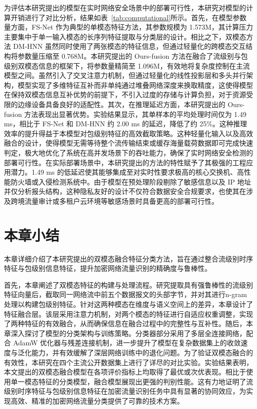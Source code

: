 为评估本研究提出的模型在实时网络安全场景中的部署可行性，本研究对模型的计算开销进行了对比分析，结果如表~\ref{tab:computational}所示。首先，在模型参数量方面，FS-Net 作为典型的单模态特征方法，其参数规模为 1.573M，其计算压力主要集中于单一输入模态的长序列特征提取与分类层的设计。相比之下，双模态方法 DM-HNN 虽然同时使用了两张模态的特征信息，但通过轻量化的跨模态交互结构将参数量压缩至 0.768M。本研究提出的 Ours-fusion 方法在融合了流级别与包级别双模态信息的框架下，将参数量精简至 1.096M，有效地将复杂度控制在主流模型之间。虽然引入了交叉注意力机制，但通过轻量化的线性投影层和多头并行架构，模型实现了多维特征互补而非单纯通过堆叠网络深度来换取精度，这使得模型在保持双模态信息互补优势的前提下，不引入过度的存储与计算负担，对于资源受限的边缘设备具备良好的适配性。其次，在推理延迟方面，本研究提出的 Ours-fusion 方法表现出显著优势。实验结果显示，其单样本的平均处理时间仅为 1.49 ms，相比于 FS-Net 和 DM-HNN 约 2.00 ms 的延迟，降低了约 25\%。这种推理效率的提升得益于本模型对包级别特征的高效截取策略。这种轻量化输入以及高效融合的设计，使得模型无需等待整个流传输结束或缓存海量载荷数据即可完成快速判定，极大地优化了系统在高并发场景下的吞吐能力，确保了实时网络安全检测的部署可行性。在实际部署场景中，本研究提出的方法的特性赋予了其极强的工程应用潜力。1.49 ms 的低延迟使其能够集成至对实时性要求极高的核心交换机、高性能防火墙或入侵检测系统中。由于模型在预处理阶段剔除了敏感信息以及 IP 地址并仅分析报头结构，这种隐私友好的设计不仅符合数据安全合规要求，也使其在涉及跨境流量审计或多租户云环境等敏感场景时具备更高的部署可行性。

\section{本章小结}
本章详细介绍了本研究提出的双模态融合特征分类方法，旨在通过整合流级别时序特征与包级别信息特征，提升加密网络流量识别的精确度与鲁棒性。

首先，本章阐述了双模态特征的构建与处理流程。研究提取具有强鲁棒性的流级别特征向量后，截取同一网络流中前五个数据报文的头部字节，并对其进行n-gram处理以构建包级别特征。针对这两种模态在维度与语义空间上的差异，本章设计了特征融合层。该层采用注意力机制，对两个模态的特征进行自适应权重调整，实现了两种特征的有效融合，从而确保信息在融合过程中的完整性与互补性。随后，本章深入探讨了模型的分类架构与训练策略。分类器部分采用了多层全连接网络，配合 AdamW 优化器与残差连接机制，进一步提升了模型在复杂数据集上的收敛速度与泛化能力，并有效缓解了深层网络训练中的退化问题。为了验证双模态融合的有效性，本研究在四个主流公开数据集上进行了详尽的对比实验。实验结果表明，本文提出的双模态融合模型在各项评价指标上均取得了最优或次优表现。相比于使用单一模态特征的分类模型，融合模型展现出更强的判别性能。这有力地证明了流级别时序特征与包级别信息特征在加密流量识别任务中具有显著的协同效应，为实现高效、精准的加密网络流量分类提供了可靠的技术方案。

